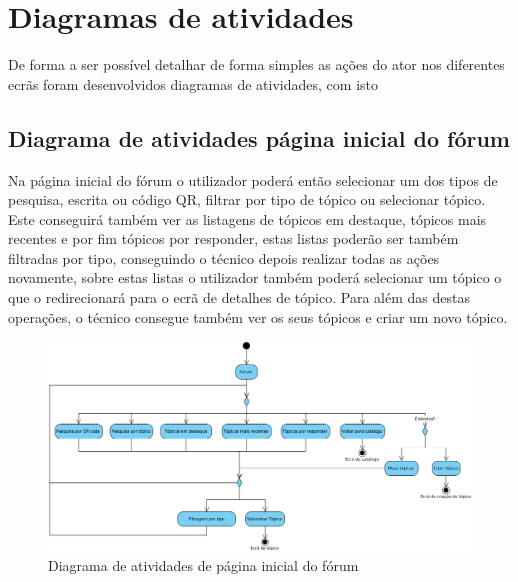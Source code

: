 \section{Diagramas de atividades}
De forma a ser possível detalhar de forma simples as ações do ator nos diferentes ecrãs foram 
desenvolvidos diagramas de atividades, com isto 





\subsection{Diagrama de atividades página inicial do fórum}

Na página inicial do fórum o utilizador poderá então selecionar um dos tipos de pesquisa, escrita 
ou código QR, filtrar por tipo de tópico ou selecionar tópico. Este conseguirá também ver as 
listagens de tópicos em destaque, tópicos mais recentes e por fim tópicos por 
responder, estas listas poderão ser também filtradas por tipo, conseguindo o 
técnico depois realizar todas as ações novamente, sobre estas listas o utilizador também poderá 
selecionar um tópico o que o redirecionará para o ecrã de detalhes de tópico. Para além das 
destas operações, o técnico consegue também ver os seus tópicos e criar um novo tópico.

\begin{figure}[htb]
    \centering
    \includegraphics[width=\textwidth]{images/diagramas/atividades/diagrama_atividades_forum.png}
    \caption{Diagrama de atividades de página inicial do fórum}
    \label{fig:22}
\end{figure}

